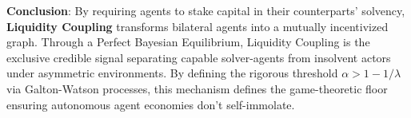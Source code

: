 \documentclass[11pt]{article}
\begin{document}
\textbf{Conclusion}: By requiring agents to stake capital in their counterparts' solvency, \textbf{Liquidity Coupling} transforms bilateral agents into a mutually incentivized graph. Through a Perfect Bayesian Equilibrium, Liquidity Coupling is the exclusive credible signal separating capable solver-agents from insolvent actors under asymmetric environments. By defining the rigorous threshold $\alpha > 1 - 1/\lambda$ via Galton-Watson processes, this mechanism defines the game-theoretic floor ensuring autonomous agent economies don't self-immolate.



\end{document}

